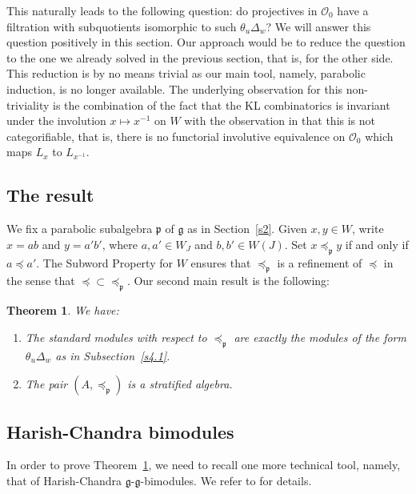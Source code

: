 \documentclass[a4paper]{amsart}
\newtheorem{theorem}{Theorem}
\begin{document}
This naturally leads to the following question: do projectives
in $\mathcal{O}_0$ have a filtration with subquotients 
isomorphic to such $\theta_u \Delta_w$? We will answer this
question positively in this section. Our approach would be to
reduce the question to the one we already solved in the 
previous section, that is, for the other side. This reduction
is by no means trivial as our main tool, namely, parabolic induction,
is no longer available. The underlying observation for 
this non-triviality is the combination of the fact that 
the KL combinatorics is invariant under the involution 
$x\mapsto x^{-1}$ on $W$ with the observation in
\cite[Remark~1.2]{MS2} that this is not categorifiable, that is,
there is no functorial involutive equivalence on $\mathcal{O}_0$ 
which maps  $L_x$ to $L_{x^{-1}}$.

\subsection{The result}\label{s4.2}

We fix a parabolic subalgebra $\mathfrak{p}$ of $\mathfrak{g}$
as in Section~\ref{s2}. Given $x,y\in W$, write
$x=ab$ and $y=a'b'$, where $a,a'\in W_J$ and $b,b'\in W(J)$.
Set $x{\preceq_\mathfrak{p}}y$ if and only if $a\preceq a'$.
The Subword Property for $W$ ensures that ${\preceq_\mathfrak{p}}$ 
is a refinement of $\preceq$ in the sense that 
$\preceq\subset {\preceq_\mathfrak{p}}$. Our second main result
is the following: 

\begin{theorem}\label{thm-main2}
We have: 

\begin{enumerate}[$($a$)$]
\item\label{thm-main2.1} The standard modules with respect 
to ${\preceq_\mathfrak{p}}$
are exactly the modules of the form 
$\theta_u \Delta_w$ as in Subsection~\ref{s4.1}.
\item\label{thm-main2.2}
The pair $(A,{\preceq_\mathfrak{p}})$ is a stratified algebra.
\end{enumerate}
\end{theorem}

\subsection{Harish-Chandra bimodules}\label{s4.3}

In order to prove Theorem~\ref{thm-main2}, we need to recall
one more technical tool, namely, that of Harish-Chandra 
$\mathfrak{g}$-$\mathfrak{g}$-bimodules. We refer to 
\cite{BG,Ja} for details.
\end{document}
